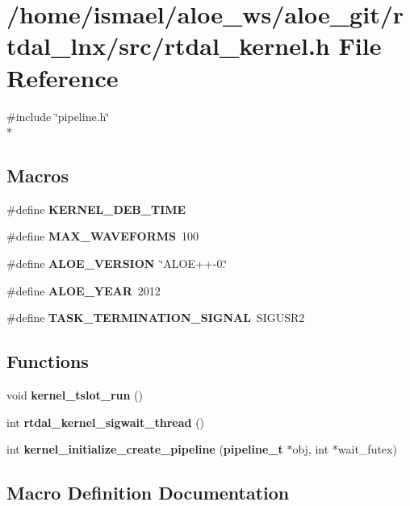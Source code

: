 \section{/home/ismael/aloe\-\_\-ws/aloe\-\_\-git/rtdal\-\_\-lnx/src/rtdal\-\_\-kernel.h File Reference}
\label{rtdal__kernel_8h}
{\ttfamily \#include \char`\"{}pipeline.\-h\char`\"{}}\\*
\subsection*{Macros}
\begin{DoxyCompactItemize}
\item 
\#define {\bf K\-E\-R\-N\-E\-L\-\_\-\-D\-E\-B\-\_\-\-T\-I\-M\-E}
\item 
\#define {\bf M\-A\-X\-\_\-\-W\-A\-V\-E\-F\-O\-R\-M\-S}~100
\item 
\#define {\bf A\-L\-O\-E\-\_\-\-V\-E\-R\-S\-I\-O\-N}~\char`\"{}A\-L\-O\-E++-\/0.\char`\"{}
\item 
\#define {\bf A\-L\-O\-E\-\_\-\-Y\-E\-A\-R}~2012
\item 
\#define {\bf T\-A\-S\-K\-\_\-\-T\-E\-R\-M\-I\-N\-A\-T\-I\-O\-N\-\_\-\-S\-I\-G\-N\-A\-L}~S\-I\-G\-U\-S\-R2
\end{DoxyCompactItemize}
\subsection*{Functions}
\begin{DoxyCompactItemize}
\item 
void {\bf kernel\-\_\-tslot\-\_\-run} ()
\item 
int {\bf rtdal\-\_\-kernel\-\_\-sigwait\-\_\-thread} ()
\item 
int {\bf kernel\-\_\-initialize\-\_\-create\-\_\-pipeline} ({\bf pipeline\-\_\-t} $\ast$obj, int $\ast$wait\-\_\-futex)
\end{DoxyCompactItemize}


\subsection{Macro Definition Documentation}
